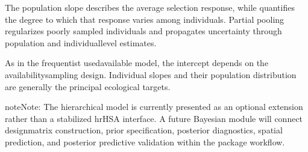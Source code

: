 \documentclass[letterpaper,10pt,english]{sphinxmanual}
\begin{document}
\begin{sphinxVerbatim}[commandchars=\\\{\}]
      
        \PYG{p}{[}\PYG{p}{]}
         \PYG{p}{[}\PYG{p}{]}  

      

      
\end{sphinxVerbatim}

\sphinxAtStartPar
The population slope  describes the average selection response, while  quantifies the degree to which that response varies among individuals. Partial pooling regularizes poorly sampled individuals and propagates uncertainty through population\sphinxhyphen{} and individual\sphinxhyphen{}level estimates.

\sphinxAtStartPar
As in the frequentist used\textendash{}available model, the intercept depends on the availability\sphinxhyphen{}sampling design. Individual slopes and their population distribution are generally the principal ecological targets.

\begin{sphinxadmonition}{note}{Note:}
\sphinxAtStartPar
The hierarchical model is currently presented as an optional extension rather than a stabilized hrHSA interface. A future Bayesian module will connect design\sphinxhyphen{}matrix construction, prior specification, posterior diagnostics, spatial prediction, and posterior predictive validation within the package workflow.
\end{sphinxadmonition}
\end{document}
